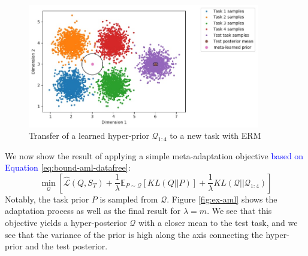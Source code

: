 \documentclass{article}
\theoremstyle{definition}
\newcommand{\Expect}[2]{\mathbb{E}_{#1}\left [#2 \right ]}
\newcommand{\LFe}[1]{\textcolor{blue}{#1}}
\begin{document}
\begin{figure}
	\centering
	\includegraphics[width=0.9\textwidth]{toy_example_erm.JPG}
	\caption{Transfer of a learned hyper-prior $\mathcal{Q}_{1:4}$ to a new task with ERM}
	\label{fig:ex-erm}
\end{figure}


We now show the result of applying a simple meta-adaptation objective \LFe{based on Equation \ref{eq:bound-aml-datafree}}: 
$$\min_{\mathcal{Q}}\left [\hat{\mathcal{L}}(Q, S_T) + \frac{1}{\lambda}\Expect{P\sim \mathcal{Q}}{KL(Q||P)}+\frac{1}{\lambda}KL(\mathcal{Q}||\mathcal{Q}_{1:4})\right ]$$
Notably, the task prior $P$ is sampled from $\mathcal{Q}$. Figure \ref{fig:ex-aml} shows the adaptation process as well as the final result for $\lambda=m$. We see that this objective yields a hyper-posterior $\mathcal{Q}$ with a closer mean to the test task, and we see that the variance of the prior is high along the axis connecting the hyper-prior and the test posterior. 
\end{document}
